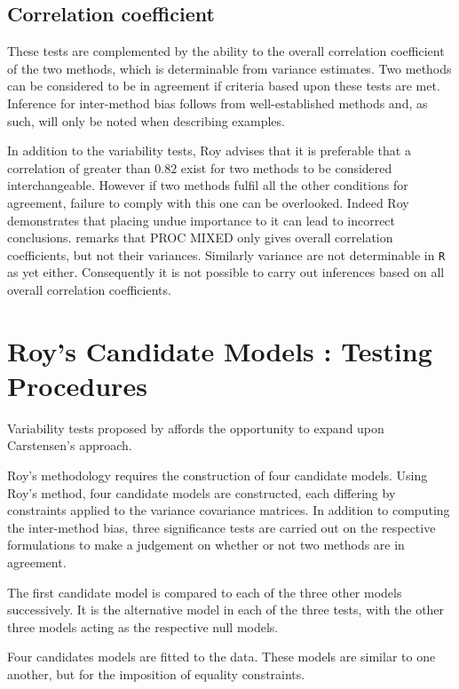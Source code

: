 \documentclass[12pt, a4paper]{report}
\theoremstyle{plain}
\theoremstyle{definition}
\theoremstyle{remark}
\begin{document}
\subsection{Correlation coefficient}

These tests are complemented by the ability to the overall correlation coefficient of the two methods, which is determinable from variance estimates. Two methods can be considered to be in agreement if criteria based upon these tests are met. Inference for inter-method bias follows from well-established methods and, as such, will only be noted when describing examples.


In addition to the variability tests, Roy advises that it is preferable that a correlation of greater than $0.82$ exist for two methods to be considered interchangeable. However if two methods fulfil all the other conditions for agreement, failure to comply with this one can be overlooked. Indeed Roy demonstrates that placing undue importance to it can lead to incorrect conclusions.
\citet{roy} remarks that PROC MIXED only gives overall correlation coefficients, but not their variances. Similarly variance are not determinable in \texttt{R} as yet either. Consequently it is not possible to carry out inferences based on all overall correlation coefficients.


\section{Roy's Candidate Models : Testing Procedures}
Variability tests proposed by \citet{ARoy2009} affords the opportunity to expand upon Carstensen's approach.

Roy's methodology requires the construction of four candidate models. 
Using Roy's method, four candidate models are constructed, each differing by constraints applied to the variance covariance matrices. In addition to computing the inter-method bias, three significance tests are carried out on the respective formulations to make a judgement on whether or not two methods are in agreement.

The first candidate model is compared to each of the three other models successively. It is the alternative model in each of the three tests, with the other three models acting as the respective null models.

Four candidates models are fitted to the data. These models are similar to one another, but for the imposition of equality constraints.
\end{document}
